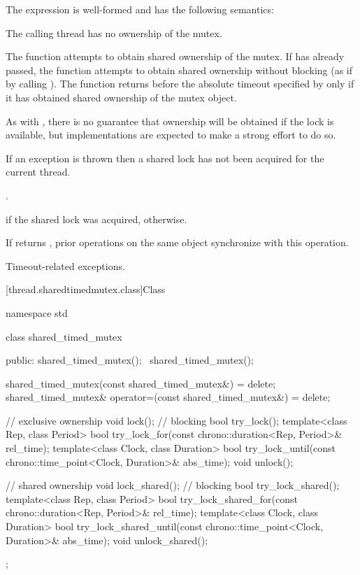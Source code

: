 \pnum
The expression  is well-formed
and has the following semantics:

\begin{itemdescr}
\pnum
\expects
The calling thread has no ownership of the mutex.

\pnum
\effects
The function attempts to obtain shared ownership of the mutex. If
 has already passed, the function attempts to obtain shared
ownership without blocking (as if by calling ). The
function returns before the absolute timeout
specified by  only if it has obtained shared ownership of the
mutex object.
\begin{note}
As with , there is no guarantee that
ownership will be obtained if the lock is available, but implementations are
expected to make a strong effort to do so.
\end{note}
If an exception is thrown then a shared lock has not been acquired for
the current thread.

\pnum
\returntype {}.

\pnum
\returns
{} if the shared lock was acquired,  otherwise.

\pnum
\sync
If  returns , prior
 operations on the same object synchronize
with this operation.

\pnum
\throws
Timeout-related exceptions.
\end{itemdescr}

[thread.sharedtimedmutex.class]{Class }

%
\begin{codeblock}
namespace std {
  class shared_timed_mutex {
  public:
    shared_timed_mutex();
    ~shared_timed_mutex();

    shared_timed_mutex(const shared_timed_mutex&) = delete;
    shared_timed_mutex& operator=(const shared_timed_mutex&) = delete;

    // exclusive ownership
    void lock();                // blocking
    bool try_lock();
    template<class Rep, class Period>
      bool try_lock_for(const chrono::duration<Rep, Period>& rel_time);
    template<class Clock, class Duration>
      bool try_lock_until(const chrono::time_point<Clock, Duration>& abs_time);
    void unlock();

    // shared ownership
    void lock_shared();         // blocking
    bool try_lock_shared();
    template<class Rep, class Period>
      bool try_lock_shared_for(const chrono::duration<Rep, Period>& rel_time);
    template<class Clock, class Duration>
      bool try_lock_shared_until(const chrono::time_point<Clock, Duration>& abs_time);
    void unlock_shared();
  };
}
\end{codeblock}

